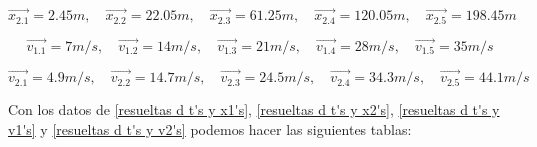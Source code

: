 \documentclass[12pt,letterpaper]{article}
\begin{document}
\begin{enumerate}
\begin{enumerate}
                \begin{equation}
                    \label{resueltas d t's y x2's}
                    \vec{x_{2.1}}=2.45m,\quad
                    \vec{x_{2.2}}=22.05m,\quad
                    \vec{x_{2.3}}=61.25m,\quad
                    \vec{x_{2.4}}=120.05m,\quad
                    \vec{x_{2.5}}=198.45m
                \end{equation}
                
                \begin{equation}
                    \label{resueltas d t's y v1's}
                    \vec{v_{1.1}}=7m/s,\quad
                    \vec{v_{1.2}}=14m/s,\quad
                    \vec{v_{1.3}}=21m/s,\quad
                    \vec{v_{1.4}}=28m/s,\quad
                    \vec{v_{1.5}}=35m/s
                \end{equation}
                
                \begin{equation}
                    \label{resueltas d t's y v2's}
                    \vec{v_{2.1}}=4.9m/s,\quad
                    \vec{v_{2.2}}=14.7m/s,\quad
                    \vec{v_{2.3}}=24.5m/s,\quad
                    \vec{v_{2.4}}=34.3m/s,\quad
                    \vec{v_{2.5}}=44.1m/s
                \end{equation}

            Con los datos de \ref{resueltas d t's y x1's}, \ref{resueltas d t's y x2's}, \ref{resueltas d t's y v1's} y \ref{resueltas d t's y v2's} podemos hacer las siguientes tablas:\newline


\end{enumerate}
\end{enumerate}
\end{document}
